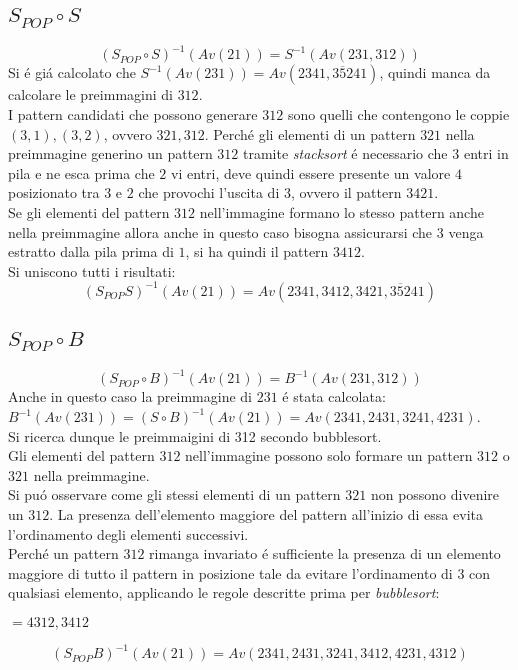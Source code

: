 \subsection*{$S_{POP}\circ{S}$}$$(S_{POP}\circ{S})^{-1}(Av(21))=S^{-1}(Av(231,312))$$
Si \'e gi\'a calcolato che $S^{-1}(Av(231))=Av(2341, 3\overline{5}241)$, quindi manca da calcolare le preimmagini di $312$.\\
I pattern candidati che possono generare $312$ sono quelli che contengono le coppie $(3,1),(3,2)$, ovvero $321, 312$.
Perch\'e gli elementi di un pattern $321$ nella preimmagine generino un pattern $312$ tramite \textit{stacksort} \'e necessario che $3$ entri in pila e ne esca prima che $2$ vi entri, deve quindi essere presente un valore $4$ posizionato tra $3$ e $2$ che provochi l'uscita di $3$, ovvero il pattern $3421$.\\
Se gli elementi del pattern $312$ nell'immagine formano lo stesso pattern anche nella preimmagine allora anche in questo caso bisogna assicurarsi che $3$ venga estratto dalla pila prima di $1$, si ha quindi il pattern $3412$.\\Si uniscono tutti i risultati:
$$(S_{POP}S)^{-1}(Av(21))=Av(2341, 3412, 3421, 3\overline{5}241)$$
\subsection*{$S_{POP}\circ{B}$}$$(S_{POP}\circ{B})^{-1}(Av(21))=B^{-1}(Av(231,312))$$
Anche in questo caso la preimmagine di $231$ \'e stata calcolata: $B^{-1}(Av(231)) = (S\circ{B})^{-1}(Av(21)) = Av(2341, 2431, 3241, 4231)$.\\
Si ricerca dunque le preimmaigini di 312 secondo bubblesort. \\
Gli elementi del pattern $312$ nell'immagine possono solo formare un pattern $312$ o $321$ nella preimmagine.\\
Si pu\'o osservare come gli stessi elementi di un pattern $321$ non possono divenire un $312$. La presenza dell'elemento maggiore del pattern all'inizio di essa evita l'ordinamento degli elementi successivi.\\
Perch\'e un pattern $312$ rimanga invariato \'e sufficiente la presenza di un elemento maggiore di tutto il pattern in posizione tale da evitare l'ordinamento di $3$ con qualsiasi elemento, applicando le regole descritte prima per \textit{bubblesort}: 
\begin{center}
$=4312,3412$
\end{center}
$$(S_{POP}{B})^{-1}(Av(21))=Av(2341, 2431, 3241, 3412, 4231, 4312)$$
